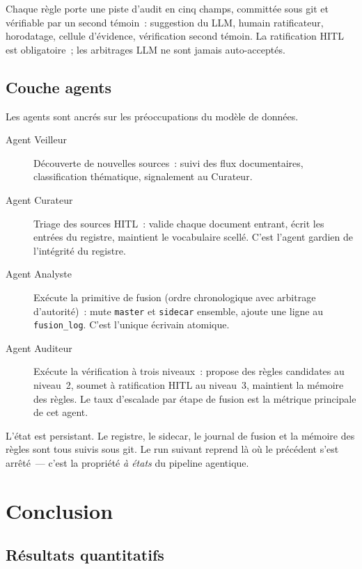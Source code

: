 \documentclass[a4paper,11pt]{report}
\begin{document}
Chaque règle porte une piste d'audit en cinq champs, committée sous git et vérifiable par un second témoin~: suggestion du LLM, humain ratificateur, horodatage, cellule d'évidence, vérification second témoin. La ratification HITL est obligatoire~; les arbitrages LLM ne sont jamais auto-acceptés.

\section{Couche agents}

Les agents sont ancrés sur les préoccupations du modèle de données.

\begin{description}
\item[Agent Veilleur] Découverte de nouvelles sources~: suivi des flux documentaires, classification thématique, signalement au Curateur.
\item[Agent Curateur] Triage des sources HITL~: valide chaque document entrant, écrit les entrées du registre, maintient le vocabulaire scellé. C'est l'agent gardien de l'intégrité du registre.
\item[Agent Analyste] Exécute la primitive de fusion (ordre chronologique avec arbitrage d'autorité)~: mute \texttt{master} et \texttt{sidecar} ensemble, ajoute une ligne au \texttt{fusion\_log}. C'est l'unique écrivain atomique.
\item[Agent Auditeur] Exécute la vérification à trois niveaux~: propose des règles candidates au niveau~2, soumet à ratification HITL au niveau~3, maintient la mémoire des règles. Le taux d'escalade par étape de fusion est la métrique principale de cet agent.
\end{description}

L'état est persistant. Le registre, le sidecar, le journal de fusion et la mémoire des règles sont tous suivis sous git. Le run suivant reprend là où le précédent s'est arrêté~--- c'est la propriété \emph{à états} du pipeline agentique.



\chapter{Conclusion}\label{chap:conclusion}

\section{Résultats quantitatifs}
\end{document}
